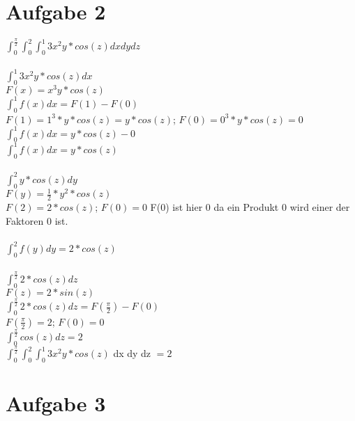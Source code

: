 \documentclass{article}
\begin{document}
	\section*{Aufgabe 2}
	$\int_{0}^{\frac{\pi}{2}}\int_{0}^{2}\int_{0}^{1}3x^2y * cos(z)dxdydz$ \\ \\
	$\int_{0}^{1} 3x^2y*cos(z)dx$ \\
	$F(x) = x^3y*cos(z)$ \\
	$\int_{0}^{1} f(x) dx = F(1) - F(0)$ \\
	$F(1) = 1^3*y*cos(z) = y*cos(z)$; $F(0) = 0^3*y*cos(z) = 0$ \\
	$\int_{0}^{1} f(x) dx = y*cos(z) -  0$ \\
	$\int_{0}^{1} f(x) dx = y*cos(z)$ \\ \\
	$\int_{0}^{2} y * cos(z) dy$ \\
	$F(y) = \frac{1}{2}*y^2*cos(z)$ \\
	$F(2) = 2*cos(z)$; $F(0) = 0$ F(0) ist hier 0 da ein Produkt 0 wird einer der Faktoren 0 ist. \\ \\
	$\int_{0}^{2}f(y)dy = 2*cos(z)$ \\ \\
	$\int_{0}^{\frac{\pi}{2}}2*cos(z) dz$ \\
	$F(z) = 2*sin(z)$ \\
	$\int_{0}^{\frac{\pi}{2}}2*cos(z) dz = F(\frac{\pi}{2}) - F(0)$ \\
	$F(\frac{\pi}{2}) = 2$; $F(0) = 0$ \\
	$\int_{0}^{\frac{\pi}{2}}cos(z) dz = 2$ \\
	$\int_{0}^{\frac{\pi}{2}}\int_{0}^{2}\int_{0}^{1}3x^2y * cos(z)$ dx dy dz $= 2$
	\section*{Aufgabe 3}
\end{document}
